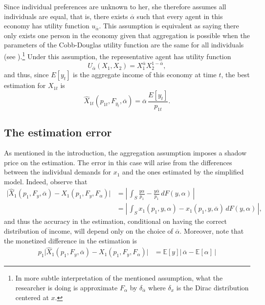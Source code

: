 \documentclass[english, a4paper,12pt]{article}
\begin{document}
Since individual preferences are unknown to her, she therefore assumes all individuals are equal, that is, there exists $\overline{\alpha}$ such that every agent in this economy has utility function $u_{\overline{\alpha}}$. This assumption is equivalent as saying there only exists one person in the economy given that aggregation is possible when the parameters of the Cobb-Douglas utility function are the same for all individuals (see ).\footnote{In more subtle interpretation of the mentioned assumption, what the researcher is doing is approximate $F_{\alpha}$ by $\delta_{\overline{\alpha}}$ where $\delta_{x}$ is the Dirac distribution centered at $x$.} Under this assumption, the representative agent has utility function
	$$U_{\overline{\alpha}}(X_{1}, X_{2}) = X_{1}^{\overline{\alpha}}X_{2}^{1-\overline{\alpha}},$$
and thus, since $E[y_{t}]$ is the aggregate income of this economy at time $t$, the best estimation for $X_{1t}$ is
	$$\widehat{X}_{1t}(p_{1t}, F_{y_{t}}, \overline{\alpha}) = \overline{\alpha}\, \frac{E[y_{t}]}{p_{1t}}.$$

\subsection{The estimation error}
As mentioned in the introduction, the aggregation assumption imposes a shadow price on the estimation. The error in this case will arise from the differences between the individual demands for $x_{1}$ and the ones estimated by the simplified model. Indeed, observe that
	\begin{align*}
		\Big| \widehat{X}_{1}(p_{1}, F_{y}, \overline{\alpha}) - X_{1}(p_{1}, F_{y}, F_{\alpha}) \Big|
			&=	\left|\, \int_{S} \frac{y \alpha}{p_{1}} - \frac{y\overline{\alpha}}{p_{1}} \, dF(y,\alpha) \,\right|	\\
			&=	\left|\, \int_{S} x_{1}(p_{1}, y, \alpha) - x_{1}(p_{1}, y, \overline{\alpha}) \, dF(y,\alpha)\, \right|,
	\end{align*}
and thus the accuracy in the estimation, conditional on having the correct distribution of income, will depend only on the choice of $\overline{\alpha}$. Moreover, note that the monetized difference in the estimation is
	\begin{align*}
		p_{1}\Big| \widehat{X}_{1}(p_{1}, F_{y}, \overline{\alpha}) - X_{1}(p_{1}, F_{y}, F_{\alpha}) \Big|
			&=	\mathbb{E}[y]\Big|\, \overline{\alpha} - \mathbb{E}[\alpha] \,\Big|
	\end{align*}
\end{document}
